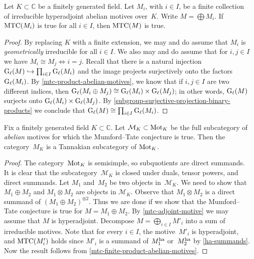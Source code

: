 \documentclass[10pt,twoside,leqno]{article}
\numberwithin{equation}{subsection}
\newcommand{\into}{\hookrightarrow}
\newcommand{\CC}{\mathbb{C}}
\newcommand{\ha}{\textnormal{ha}}
\newcommand{\Mot}{\textnormal{Mot}}
\newcommand{\GG}{\textnormal{G}}
\newcommand{\Gl}{\GG_{\ell}}
\newcommand{\MTC}{\textnormal{MTC}}
\begin{document}
\begin{lemma} %
	\label{mtc-finite-product-abelian-motives}
	Let $K \subset \CC$ be a finitely generated field.
	Let $M_{i}$, with $i \in I$, be a finite collection of
	irreducible hyperadjoint abelian motives over~$K$.
	Write $M = \bigoplus M_{i}$.
	If $\MTC(M_{i})$ is true for all $i \in I$,
	then $\MTC(M)$ is true.
	\begin{proof}
		By replacing $K$ with a finite extension,
		we may and do assume that $M_i$ is \emph{geometrically} irreducible
		for all $i \in I$.
		We also may and do assume that for $i,j \in I$
		we have $M_{i} \cong M_{j} \iff i = j$.
		Recall that there is a natural injection
		$\Gl(M) \into \prod_{i \in I} \Gl(M_{i})$
		and the image projects surjectively onto the factors $\Gl(M_{i})$.
		By \cref{mtc-product-abelian-motives},
		we know that if $i,j \in I$ are two different indices,
		then $\Gl(M_{i} \oplus M_{j}) \cong \Gl(M_{i}) \times \Gl(M_{j})$;
		in other words,
		$\Gl(M)$ surjects onto $\Gl(M_{i}) \times \Gl(M_{j})$.
		By \cref{subgroup-surjective-projection-binary-products}
		we conclude that $\Gl(M) \cong \prod_{i \in I} \Gl(M_{i})$.
	\end{proof}
\end{lemma}

\begin{theorem} %
	\label{mtc-abelian-motives-tannakian-subcategory}
	Fix a finitely generated field $K \subset \CC$.
	Let $\mathcal{M}_K \subset \Mot_K$ be the full subcategory
	of \emph{abelian} motives for which the Mumford--Tate conjecture is true.
	Then the category~$M_K$ is a Tannakian subcategory of $\Mot_K$.
	\begin{proof}
		The category~$\Mot_K$ is semisimple,
		so subquotients are direct summands.
		It is clear that the subcategory~$\mathcal{M}_K$
		is closed under duals, tensor powers, and direct summands.
		Let $M_1$ and~$M_2$ be two objects in~$\mathcal{M}_K$.
		We need to show that $M_1 \oplus M_2$
		and $M_1 \otimes M_2$ are objects in $\mathcal{M}_K$.
		Observe that $M_1 \otimes M_2$ is a direct summand of
		$(M_1 \oplus M_2)^{\otimes 2}$.
		Thus we are done if we show that the Mumford--Tate conjecture is true for
		$M = M_1 \oplus M_2$.
		By \cref{mtc-adjoint-motive} we may assume that $M$ is hyperadjoint.
		Decompose $M = \bigoplus_{i \in I} M'_i$ into a sum of irreducible motives.
  Note that for every $i \in I$, the motive~$M'_i$ is hyperadjoint,
  and $\MTC(M'_i)$ holds
  since $M'_i$ is a summand of $M_1^\ha$ or~$M_2^\ha$ by \cref{ha-summands}.
		Now the result follows from \cref{mtc-finite-product-abelian-motives}.
	\end{proof}
\end{theorem}
\end{document}
